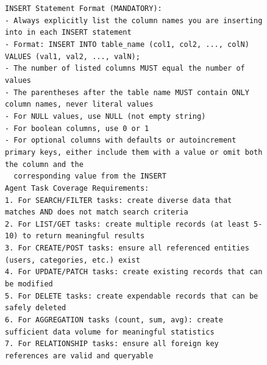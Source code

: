 \begin{figure}[p]
{\begin{minipage}{0.97\textwidth}
        \texttt{INSERT Statement Format (MANDATORY):}\\
        \texttt{- Always explicitly list the column names you are inserting into in each INSERT statement}\\
        \texttt{- Format: INSERT INTO table\_name (col1, col2, ..., colN) VALUES (val1, val2, ..., valN);}\\
        \texttt{- The number of listed columns MUST equal the number of values}\\
        \texttt{- The parentheses after the table name MUST contain ONLY column names, never literal values}\\
        \texttt{- For NULL values, use NULL (not empty string)}\\
        \texttt{- For boolean columns, use 0 or 1}\\
        \texttt{- For optional columns with defaults or autoincrement primary keys, either include them with a value or omit both the column and the}\\
        \texttt{~~corresponding value from the INSERT}\\[4pt]

        \texttt{Agent Task Coverage Requirements:}\\
        \texttt{1. For SEARCH/FILTER tasks: create diverse data that matches AND does not match search criteria}\\
        \texttt{2. For LIST/GET tasks: create multiple records (at least 5-10) to return meaningful results}\\
        \texttt{3. For CREATE/POST tasks: ensure all referenced entities (users, categories, etc.) exist}\\
        \texttt{4. For UPDATE/PATCH tasks: create existing records that can be modified}\\
        \texttt{5. For DELETE tasks: create expendable records that can be safely deleted}\\
        \texttt{6. For AGGREGATION tasks (count, sum, avg): create sufficient data volume for meaningful statistics}\\
        \texttt{7. For RELATIONSHIP tasks: ensure all foreign key references are valid and queryable}\\[4pt]


\end{minipage}}
\end{figure}
